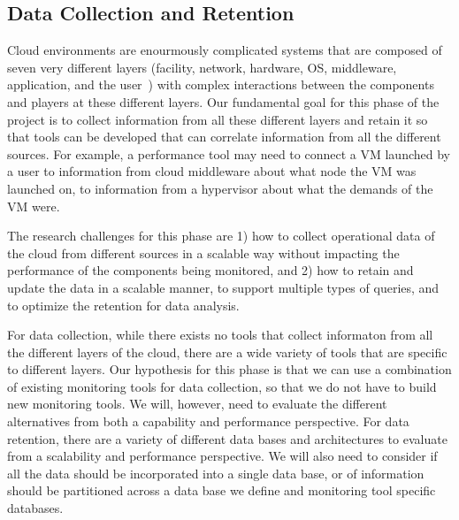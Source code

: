 \subsection{Data Collection and Retention}

Cloud environments are enourmously complicated systems that are composed of seven very different layers (facility, network, hardware, OS, middleware, application, and the user~\cite{spring2011monitoring}) with complex interactions between the components and players at these different layers.  Our fundamental goal for this phase of the project is to collect information from all these different layers and retain it so that tools can be developed that can correlate information from all the different sources.  For example, a performance tool may need to connect a VM launched by a user to information from cloud middleware about what node the VM was launched on, to information from a hypervisor about what the demands of the VM were. 


The research challenges for this phase are 1) how to collect operational data of the cloud from different sources in a scalable way without impacting the performance of the components being monitored, and 2)  how to retain and update the data in a scalable manner, to support multiple types of queries, and to optimize the retention for data analysis.

For data collection, while there exists no tools that collect informaton from all the different layers of the cloud, there are a wide variety of tools that are specific to different layers.  Our hypothesis for this phase is that we can use a combination of existing monitoring tools for data collection, so that we do not have to build new monitoring tools.  We will, however, need to evaluate the different alternatives from both a capability and performance perspective.  
For data retention, there are a variety of different data bases and architectures to evaluate from a scalability and performance perspective.  We will also need to consider if all the data should be incorporated into a single data base, or of information should be partitioned across a data base we define and monitoring tool specific databases. 

